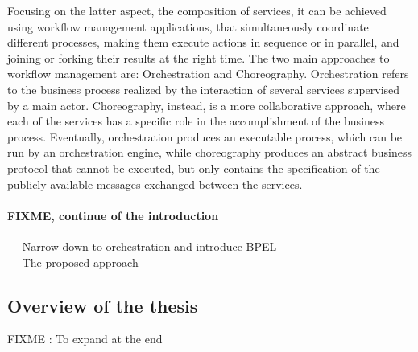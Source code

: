 Focusing on the latter aspect, the composition of services, it can be achieved using workflow management applications, that simultaneously coordinate different processes, making them execute actions in sequence or in parallel, and joining or forking their results at the right time. %
The two main approaches to workflow management are: Orchestration and Choreography.
Orchestration refers to the %
business process realized by the interaction of several services supervised by a main actor. Choreography, instead, is a more collaborative approach, where each of the services has a specific role in the accomplishment of the business process. Eventually, orchestration produces an executable process, which can be run by an orchestration engine, while choreography produces an abstract business protocol that cannot be executed, but only contains the specification of the publicly available messages exchanged between the services.\\

\paragraph{FIXME, continue of the introduction}
--- Narrow down to orchestration and introduce BPEL \\
--- The proposed approach \\




\subsection{Overview of the thesis}
FIXME : To expand at the end


